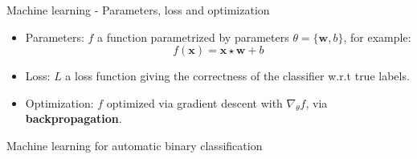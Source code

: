 \documentclass[10pt,aspectratio=169]{beamer}
\newcommand{\grad}{\nabla}
\begin{document}
\begin{frame}{Machine learning - Parameters, loss and optimization}

    \begin{itemize}
        \setlength\itemsep{2em}

        \item \alert{Parameters}: $f$ a function parametrized by parameters $\theta = \{\mathbf{w}, b \}$, for example:
            \begin{equation}
                f(\mathbf{x}) = \mathbf{x} \star \mathbf{w} + b
            \end{equation}

        \pause
        \item \alert{Loss}: $L$ a loss function giving the correctness of the classifier w.r.t true labels.

        \pause
        \item \alert{Optimization}: $f$ optimized via gradient descent with $\grad_\theta f$, via \textbf{backpropagation}.
                
    \end{itemize}

\end{frame}


\begin{frame}{Machine learning for automatic binary classification}
\end{frame}
\end{document}
